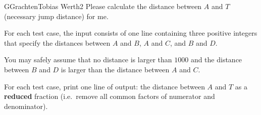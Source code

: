 \begin{icpcproblem}{G}{Grachten}{Tobias Werth}{2}
Please calculate the distance between $A$ and $T$ (necessary jump
distance) for me.


For each test case, the input consists of one line containing three positive integers that
specify the distances between $A$ and $B$, $A$ and $C$, and $B$ and $D$.

You may safely assume that no distance is larger than $1000$ and the distance
between $B$ and $D$ is larger than the distance between $A$ and $C$.


For each test case, print one line of output: the distance between $A$ and $T$ as a {\bf reduced}
fraction (i.e.\ remove all common factors of numerator and denominator).


\end{icpcproblem}
